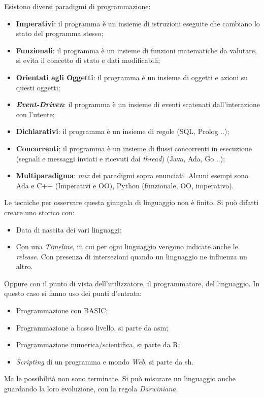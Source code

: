 \documentclass[10pt,a4paper]{book}
\begin{document}
Esistono diversi paradigmi di programmazione:
\begin{itemize}
\item \textbf{Imperativi}: il programma \`e un insieme di istruzioni eseguite  che cambiano lo stato del programma stesso;
\item \textbf{Funzionali}: il programma \`e un insieme di funzioni matematiche da valutare, si evita il concetto di stato e dati modificabili;
\item \textbf{Orientati agli Oggetti}: il programma \`e un insieme di oggetti e azioni su questi oggetti;
\item \textbf{\textit{Event-Driven}}: il programma \`e un insieme di eventi scatenati dall'interazione con l'utente;
\item \textbf{Dichiarativi}: il programma \`e un insieme di regole (SQL, Prolog ..);
\item \textbf{Concorrenti}: il programma \`e un insieme di flussi concorrenti in esecuzione (segnali e messaggi inviati e ricevuti dai \textit{thread}) (Java, Ada, Go ..);
\item \textbf{Multiparadigma}: \textit{mix} dei paradigmi sopra enunciati. Alcuni esempi sono Ada e C++ (Imperativi e OO), Python (funzionale, OO, imperativo).
\end{itemize}
\noindent
Le tecniche per osservare questa giungala di linguaggio non \`e finito. Si pu\`o difatti creare uno storico con:
\begin{itemize}
\item Data di nascita dei vari linguaggi;
\item Con una \textit{Timeline}, in cui per ogni linguaggio vengono indicate anche le \textit{release}. Con presenza di intersezioni quando un linguaggio ne influenza un altro.
\end{itemize}
\noindent
Oppure con il punto di vista dell'utilizzatore, il programmatore, del linguaggio. In questo caso si fanno uso dei punti d'entrata:
\begin{itemize}
\item Programmazione con BASIC;
\item Programmazione a basso livello, si parte da asm;
\item Programmazione numerica/scientifica, si parte da R;
\item \textit{Scripting} di un programma e mondo \textit{Web}, si parte da sh.
\end{itemize}
\noindent
Ma le possibilit\`a non sono terminate. Si pu\`o misurare un linguaggio anche guardando la loro evoluzione, con la regola \textit{Darwiniana}.
\end{document}
